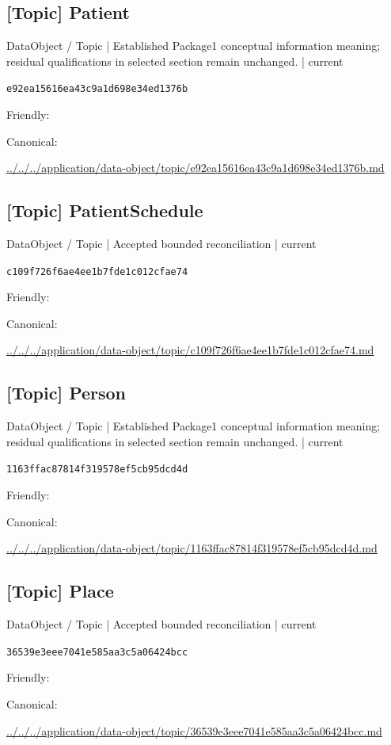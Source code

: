 \documentclass[10pt,a4paper]{article}
\begin{document}
\subsection*{[Topic] Patient}
{\small DataObject / Topic | Established Package1 conceptual information meaning; residual qualifications in selected section remain unchanged. | current}\par
\texttt{e92ea15616ea43c9a1d698e34ed1376b}\par
Friendly: \par
Canonical: \par
{\footnotesize\url{../../../application/data-object/topic/e92ea15616ea43c9a1d698e34ed1376b.md}}\par
\subsection*{[Topic] PatientSchedule}
{\small DataObject / Topic | Accepted bounded reconciliation | current}\par
\texttt{c109f726f6ae4ee1b7fde1c012cfae74}\par
Friendly: \par
Canonical: \par
{\footnotesize\url{../../../application/data-object/topic/c109f726f6ae4ee1b7fde1c012cfae74.md}}\par
\subsection*{[Topic] Person}
{\small DataObject / Topic | Established Package1 conceptual information meaning; residual qualifications in selected section remain unchanged. | current}\par
\texttt{1163ffac87814f319578ef5cb95dcd4d}\par
Friendly: \par
Canonical: \par
{\footnotesize\url{../../../application/data-object/topic/1163ffac87814f319578ef5cb95dcd4d.md}}\par
\subsection*{[Topic] Place}
{\small DataObject / Topic | Accepted bounded reconciliation | current}\par
\texttt{36539e3eee7041e585aa3c5a06424bcc}\par
Friendly: \par
Canonical: \par
{\footnotesize\url{../../../application/data-object/topic/36539e3eee7041e585aa3c5a06424bcc.md}}\par
\end{document}
